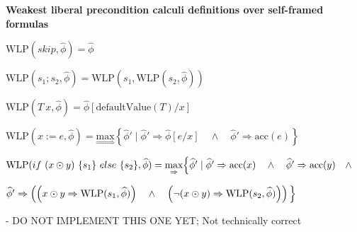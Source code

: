 \documentclass {article}
\newcommand{\eif}[3]{if \ ( #1 ) \ \{ #2 \} \ else \ \{#3\}}
\newcommand{\fphi}{\widehat{\phi}}
\newcommand{\acc}[1]{\text{acc}(#1)}
\newcommand{\imp}{\Rightarrow}
\newcommand{\maximp}[2]{\underset{\Rightarrow}{\text{max}}\left\{#1 \mid #2\right\}}
\newcommand{\wlp}[2]{\text{WLP}(#1,#2)}
\begin{document}

\begin{center}
\textbf{Weakest liberal precondition calculi definitions over self-framed formulas}
\end{center}

$\wlp{skip}{\fphi} = \fphi  $

\vspace{0.5cm}

$\wlp{s_1;s_2}{\fphi} = \wlp{s_1}{\wlp{s_2}{\fphi}} $

\vspace{0.5cm}

$\wlp{T\ x}{\fphi} = \fphi\left[\text{defaultValue}(T)/x\right] $

\vspace{0.5cm}

$\wlp{x := e}{\fphi} =\maximp{\fphi'}{\fphi' \imp \fphi[e/x] \quad \wedge \quad \fphi' \imp \acc{e}} $

\vspace{0.5cm}

$\wlp{\eif{x \odot y}{s_1}{s_2}}{\fphi} =  \underset{\Rightarrow}{\text{max}} \Big{\{} \fphi' \mid \fphi' \imp \text{acc}(x) \quad \wedge \quad \fphi' \imp \text{acc}(y) \quad \wedge \quad$ 

\indent  \hspace{4cm} $\fphi' \imp \left(\left(x \odot y \imp \wlp{s_1}{\fphi}\right) \quad \wedge \quad \left(\neg(x \odot y) \imp \wlp{s_2}{\fphi}\right)\right) \Big{\}}$

\indent  \hspace{4cm} - DO NOT IMPLEMENT THIS ONE YET; Not technically correct

\vspace{0.5cm}
\end{document}

